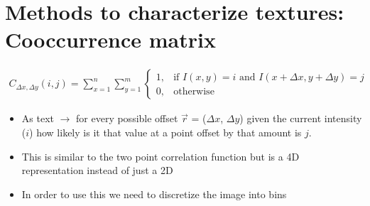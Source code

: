 \documentclass[letterpaper,10pt,english]{sphinxmanual}
\begin{document}
\begin{sphinxVerbatim}[commandchars=\\\{\}]
      

     
      
\end{sphinxVerbatim}

\noindent{}


\section{Methods to characterize textures: Co\sphinxhyphen{}occurrence matrix}
\label{\detokenize{06-AdvancedShapeAndTexture:methods-to-characterize-textures-co-occurrence-matrix}}\begin{equation*}
\begin{split}
C_{\Delta x, \Delta y}(i,j)=\sum_{x=1}^n\sum_{y=1}^m\begin{cases} 1, & \text{if }I(x, y)=i\text{ and }I(x+\Delta x, y+\Delta y)=j \\ 0, & \text{otherwise}\end{cases}
\end{split}
\end{equation*}\begin{itemize}
\item {} 
\sphinxAtStartPar
As text \(\rightarrow\) for every possible offset \(\vec{r}\) = (\(\Delta x\), \(\Delta y\)) given the current intensity (\(i\)) how likely is it that value at a point offset by that amount is \(j\).

\item {} 
\sphinxAtStartPar
This is similar to the two point correlation function but is a 4D representation instead of just a 2D

\item {} 
\sphinxAtStartPar
In order to use this we need to discretize the image into bins

\end{itemize}
\end{document}
